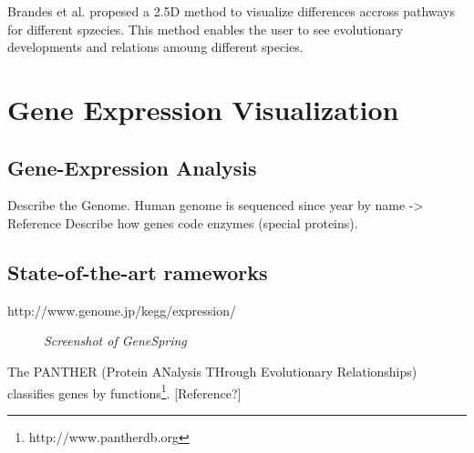 Brandes et al. propesed a 2.5D method to visualize differences accross pathways for different spzecies\citep{Brandes2004}. This method enables the user to see evolutionary developments and relations amoung different species.

\section{Gene Expression Visualization}

\subsection{Gene-Expression Analysis}

Describe the Genome.
Human genome is sequenced since year by name -> Reference 
Describe how genes code enzymes (special proteins).

\subsection{State-of-the-art rameworks}

http://www.genome.jp/kegg/expression/


\begin{figure}[ht]
\centering
{} 
\caption[Screenshot of GeneSpring]{\textit{Screenshot of GeneSpring}} 
\label{gfx:screenshot_gene_spring}
\end{figure}


The PANTHER (Protein ANalysis THrough Evolutionary Relationships) classifies genes by functions\footnote{http://www.pantherdb.org}.
[Reference?]

